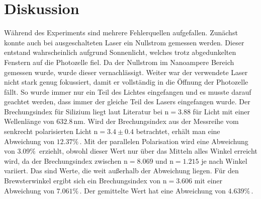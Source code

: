\section{Diskussion}
\label{sec:Diskussion}

Während des Experiments sind mehrere Fehlerquellen aufgefallen. Zunächst konnte auch bei ausgeschalteten Laser ein Nullstrom gemessen werden. Dieser entstand wahrscheinlich aufgrund Sonnenlicht, welches trotz abgedunkelten Fenstern auf die Photozelle fiel.
Da der Nullstrom im Nanoampere Bereich gemessen wurde, wurde dieser vernachlässigt.
Weiter war der verwendete Laser nicht stark genug fokussiert, damit er vollständig in die Öffnung der Photozelle fällt. So wurde immer nur ein Teil des Lichtes eingefangen und es musste darauf geachtet werden, dass immer der gleiche Teil des Lasers eingefangen wurde.
Der Brechungsindex für Silizium liegt laut Literatur \cite{ap02} bei $ \text{n} = 3.88 $ für Licht mit einer Wellenlänge von $ 632.8 \, \unit{\nano\meter}$.
Wird der Brechungsindex aus der Messreihe vom senkrecht polarisierten Licht $ \text{n} = 3.4 \pm 0.4 $ betrachtet, erhält man eine Abweichung von $ 12.37 \% \,. $
Mit der parallelen Polarisation wird eine Abweichung von $ 3.09 \% \, $ erziehlt, obwohl dieser Wert nur über das Mitteln alles Winkel erreicht wird, da der Brechungsindex zwischen $ \text{n} = 8.069 $ und  $ \text{n} = 1.215 $ je nach Winkel variiert.
Das sind Werte, die weit außerhalb der Abweichung liegen.
Für den Brewsterwinkel ergibt sich ein Brechungsindex von $ \text{n} = 3.606 $ mit einer Abweichung von $ 7.061 \% \, .$ Der gemittelte Wert hat eine Abweichung von $ 4.639 \% \, .$
